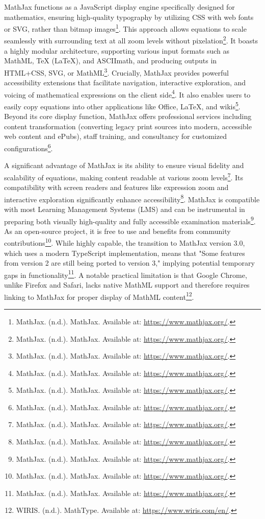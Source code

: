 MathJax functions as a JavaScript display engine specifically designed for mathematics, ensuring high-quality typography by utilizing CSS with web fonts or SVG, rather than bitmap images\footnote{MathJax. (n.d.). MathJax. Available at: \url{https://www.mathjax.org/}.}. This approach allows equations to scale seamlessly with surrounding text at all zoom levels without pixelation\footnote{MathJax. (n.d.). MathJax. Available at: \url{https://www.mathjax.org/}.}. It boasts a highly modular architecture, supporting various input formats such as MathML, TeX (LaTeX), and ASCIImath, and producing outputs in HTML+CSS, SVG, or MathML\footnote{MathJax. (n.d.). MathJax. Available at: \url{https://www.mathjax.org/}.}. Crucially, MathJax provides powerful accessibility extensions that facilitate navigation, interactive exploration, and voicing of mathematical expressions on the client side\footnote{MathJax. (n.d.). MathJax. Available at: \url{https://www.mathjax.org/}.}. It also enables users to easily copy equations into other applications like Office, LaTeX, and wikis\footnote{MathJax. (n.d.). MathJax. Available at: \url{https://www.mathjax.org/}.}. Beyond its core display function, MathJax offers professional services including content transformation (converting legacy print sources into modern, accessible web content and ePubs), staff training, and consultancy for customized configurations\footnote{MathJax. (n.d.). MathJax. Available at: \url{https://www.mathjax.org/}.}.

A significant advantage of MathJax is its ability to ensure visual fidelity and scalability of equations, making content readable at various zoom levels\footnote{MathJax. (n.d.). MathJax. Available at: \url{https://www.mathjax.org/}.}. Its compatibility with screen readers and features like expression zoom and interactive exploration significantly enhance accessibility\footnote{MathJax. (n.d.). MathJax. Available at: \url{https://www.mathjax.org/}.}. MathJax is compatible with most Learning Management Systems (LMS) and can be instrumental in preparing both visually high-quality and fully accessible examination materials\footnote{MathJax. (n.d.). MathJax. Available at: \url{https://www.mathjax.org/}.}. As an open-source project, it is free to use and benefits from community contributions\footnote{MathJax. (n.d.). MathJax. Available at: \url{https://www.mathjax.org/}.}. While highly capable, the transition to MathJax version 3.0, which uses a modern TypeScript implementation, means that "Some features from version 2 are still being ported to version 3," implying potential temporary gaps in functionality\footnote{MathJax. (n.d.). MathJax. Available at: \url{https://www.mathjax.org/}.}. A notable practical limitation is that Google Chrome, unlike Firefox and Safari, lacks native MathML support and therefore requires linking to MathJax for proper display of MathML content\footnote{WIRIS. (n.d.). MathType. Available at: \url{https://www.wiris.com/en/}.}.

